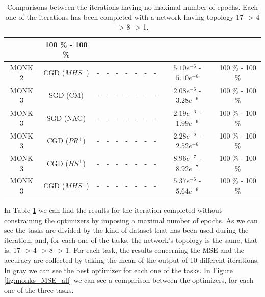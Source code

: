 \begin{table}[H]
\begin{subtable}{\textwidth}
{\begin{tabular}{| c | c | c | c | c | c | c | c | c | c | c |}
                            & 100 \% - 100 \% \\
                            \hline
                            \rowcolor[gray]{.9}
                            MONK 2 & CGD ($MHS^{+}$) & - & - & - & - & - & - & - & $5.10e^{-6}$ - $5.10e^{-6}$
                            & 100 \% - 100 \% \\
                            \hline
                            \hline
                            MONK 3 & SGD (CM) & - & - & - & - & - & - & - & $2.08e^{-6}$ - $3.28e^{-6}$
                            & 100 \% - 100 \% \\
                            \hline
                            MONK 3 & SGD (NAG) & - & - & - & - & - & - & - & $2.19e^{-6}$ - $1.99e^{-6}$
                            & 100 \% - 100 \% \\
                            \hline
                            MONK 3 & CGD ($PR^{+}$) & - & - & - & - & - & - & - & $2.28e^{-5}$ - $2.52e^{-6}$
                            & 100 \% - 100 \% \\
                            \hline
                            \rowcolor[gray]{.9}
                            MONK 3 & CGD ($HS^{+}$) & - & - & - & - & - & - & - & $8.96e^{-7}$ - $8.92e^{-7}$
                            & 100 \% - 100 \% \\
                            \hline
                            MONK 3 & CGD ($MHS^{+}$) & - & - & - & - & - & - & - & $5.37e^{-6}$ - $5.64e^{-6}$
                            & 100 \% - 100 \% \\
                            \hline
                        \end{tabular}
                    }
                \end{subtable}
                \caption{Comparisons between the iterations having no maximal number of epochs. Each one of the
                iterations has been completed with a network having topology 17 -> 4 -> 8 -> 1.}
                \label{tab:monks_no_max_epochs}
            \end{table}

            In Table \ref{tab:monks_no_max_epochs} we can find the results for the iteration completed without
            constraining the optimizers by imposing a maximal number of epochs. As we can see the tasks are
            divided by the kind of dataset that has been used during the iteration, and, for each one of the
            tasks, the network's topology is the same, that is, 17 -> 4 -> 8 -> 1. For each task, the results
            concerning the MSE and the accuracy are collected by taking the mean of the output of 10 different
            iterations. In gray we can see the best optimizer for each one of the tasks. In Figure
            \ref{fig:monks_MSE_all} we can see a comparison between the optimizers, for each one of the three
            tasks.

